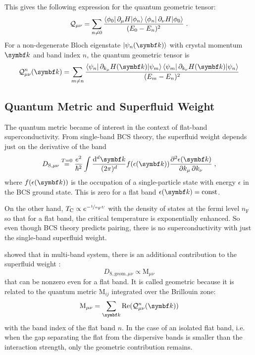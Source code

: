 \documentclass[../main.tex]{subfiles}
\begin{document}
This gives the following expression for the quantum geometric tensor:
\begin{align}
	\mathcal{Q}_{\mu \nu} = \sum_{n \neq 0} \frac{\braket{\phi_0 | \pdif{\mu} H | \phi_n} \braket{\phi_n | \pdif{\nu} H | \phi_0}}{(E_0 - E_n)^2} \;.
\end{align}
For a non-degenerate Bloch eigenstate \(\ket{\psi_n (\vb{k})}\) with crystal momentum \(\vb{k}\) and band index \(n\), the quantum geometric tensor is
\begin{equation}
	\mathcal{Q}_{\mu \nu}^n (\vb{k}) = \sum_{m \neq n} \frac{\braket{\psi_n | \pdif{k_{\mu}} H (\vb{k}) | \psi_m} \braket{\psi_m | \pdif{k_{\nu}} H (\vb{k}) | \psi_n}}{(E_m - E_n)^2}
\end{equation}

\subsection*{Quantum Metric and Superfluid Weight}

The quantum metric became of interest in the context of flat-band superconductivity.
From single-band BCS theory, the superfluid weight depends just on the derivative of the band \cite{tormaSuperconductivitySuperfluidityQuantum2022}
\begin{equation}
	D_{\mathrm{S}, \mu \nu} \overset{T = 0}{=} \frac{e^2}{\hbar^2} \int \frac{\odif[order={d}]{\vb{k}}}{(2\pi)^d} f(\epsilon (\vb{k})) \pdv{\epsilon (\vb{k})}{k_{\mu}, k_{\nu}}\;,
\end{equation}
where \(f(\epsilon (\vb{k}))\) is the occupation of a single-particle state with energy \(\epsilon\) in the BCS ground state.
This is zero for a flat band \(\epsilon (\vb{k}) = \mathrm{const}\).

On the other hand, \(T_{\mathrm{C}} \propto e^{-\nicefrac{1}{n_{\mathrm{F}} U}}\) with the density of states at the fermi level \(n_{\mathrm{F}}\) so that for a flat band, the critical temperature is exponentially enhanced.
So even though BCS theory predicts pairing, there is no superconductivity with just the single-band superfluid weight.

\citeauthor{peottaSuperfluidityTopologicallyNontrivial2015} showed that in multi-band system, there is an additional contribution to the superfluid weight \cite{peottaSuperfluidityTopologicallyNontrivial2015}:
\begin{equation}\label{eq:geometric SF weight}
	D_{\mathrm{S}, \mathrm{geom}, \mu \nu} \propto \mathrm{M}_{\mu \nu}
\end{equation}
that can be nonzero even for a flat band.
It is called geometric because it is related to the quantum metric \(\mathrm{M}_{ij}\) integrated over the Brillouin zone:
\begin{equation}
	\mathrm{M}_{\mu \nu} = \sum_{\vb{k}} \RE(\mathcal{Q}_{\mu \nu}^n (\vb{k}))
\end{equation}
with the band index of the flat band \(n\).
In the case of an isolated flat band, i.e. when the gap separating the flat from the dispersive bands is smaller than the interaction strength, only the geometric contribution remains.
\end{document}
